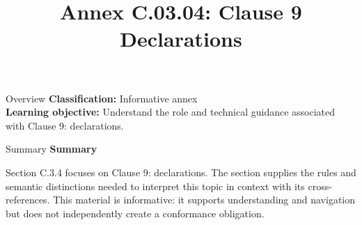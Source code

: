 \documentclass[10pt,letterpaper]{article}
\title{Annex C.03.04: Clause 9 Declarations}
\author{}
\date{}
\begin{document}
\maketitle
\begin{CornellOverviewBox}{Overview}
\textbf{Classification:} Informative annex\\[2pt]
\textbf{Learning objective:} Understand the role and technical guidance associated with Clause 9: declarations.
\end{CornellOverviewBox}\begin{CornellSummaryBox}{Summary}
{\sffamily\bfseries\color{Accent} Summary}\par\vspace{3pt}Section C.3.4 focuses on Clause 9: declarations. The section supplies the rules and semantic distinctions needed to interpret this topic in context with its cross-references. This material is informative: it supports understanding and navigation but does not independently create a conformance obligation.
\end{CornellSummaryBox}
\end{document}
